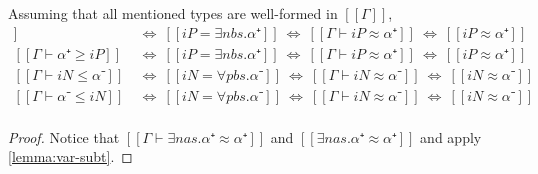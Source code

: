 \begin{corollary}
  \label{corollary:vars-no-proper-subtypes}
  Assuming that all mentioned types are well-formed in $[[Γ]]$,
  \begin{align*}
    [[Γ ⊢ iP ≥ α⁺]] ~ &\iff ~ [[iP = ∃nbs.α⁺]]  ~ \iff ~ [[Γ ⊢ iP ≈ α⁺]] ~ \iff ~ [[iP ≈ α⁺]]\\
    [[Γ ⊢ α⁺≥ iP]]  ~ &\iff ~ [[iP = ∃nbs.α⁺]]  ~ \iff ~ [[Γ ⊢ iP ≈ α⁺]] ~ \iff ~ [[iP ≈ α⁺]]\\
    [[Γ ⊢ iN ≤ α⁻]] ~ &\iff ~ [[iN = ∀pbs.α⁻]]  ~ \iff ~ [[Γ ⊢ iN ≈ α⁻]] ~ \iff ~ [[iN ≈ α⁻]]\\
    [[Γ ⊢ α⁻ ≤ iN]] ~ &\iff ~ [[iN = ∀pbs.α⁻]]  ~ \iff ~ [[Γ ⊢ iN ≈ α⁻]] ~ \iff ~ [[iN ≈ α⁻]]\\
  \end{align*}
\end{corollary}
\begin{proof}
  Notice that $[[Γ ⊢ ∃nas.α⁺ ≈ α⁺]]$ and $[[∃nas.α⁺ ≈ α⁺]]$ and apply
  \cref{lemma:var-subt}.
\end{proof}

